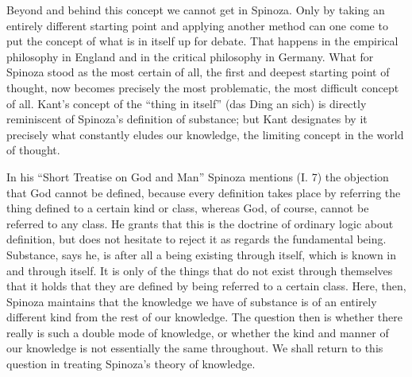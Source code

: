 \documentclass[12pt]{book}
\newcommand{\opage}[1]{\marginnote{\footnotesize\textit{[#1]}}}
\begin{document}
Beyond and behind this concept we cannot get in Spinoza. Only by taking an entirely
different starting point and applying another method can one come to put the concept of
what is in itself up for debate. That happens in the empirical philosophy in England
and in the critical philosophy in Germany. What for Spinoza stood as the most certain
of all, the first and deepest starting point of thought, now becomes precisely the most
problematic, the most difficult concept of all. Kant's concept of the ``thing in
itself'' (das Ding an sich) is directly reminiscent of Spinoza's definition of
substance; but Kant designates by it precisely what constantly eludes our knowledge,
the limiting concept in the world of thought.

In his ``Short Treatise on God and Man'' Spinoza mentions (I. 7) the objection that God
cannot be defined, because every definition takes place by referring the thing defined
to a certain kind or class, whereas God, of course, cannot be referred to any class. He
grants that this is the doctrine of ordinary logic about definition, but does not
hesitate to reject it as regards the fundamental being. Substance, says \opage{80}he,
is after all a being existing through itself, which is known in and through itself. It
is only of the things that do not exist through themselves that it holds that they are
defined by being referred to a certain class. Here, then, Spinoza maintains that the
knowledge we have of substance is of an entirely different kind from the rest of our
knowledge. The question then is whether there really is such a double mode of
knowledge, or whether the kind and manner of our knowledge is not essentially the same
throughout. We shall return to this question in treating Spinoza's theory of knowledge.
\end{document}
